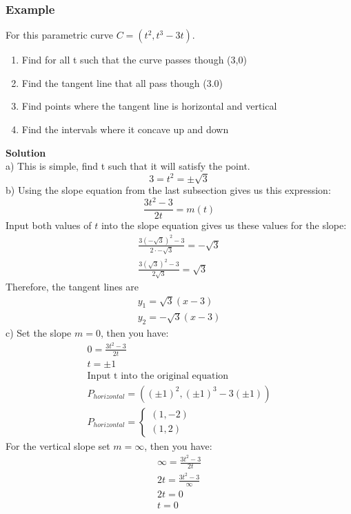 \documentclass[./MATH-115-Notes.tex]{subfiles}
\begin{document}
\subsubsection{Example}
For this parametric curve $ C = (t^2, t^3 - 3t) $.
\begin{enumerate}[label=\alph*)]
    \item Find for all t such that the curve passes though (3,0)
    \item Find the tangent line that all pass though (3.0)
    \item Find points where the tangent line is horizontal and vertical
    \item Find the intervals where it concave up and down
\end{enumerate}
\textbf{Solution}\\
\noindent
a) This is simple, find t such that it will satisfy the point.
$$
    3 = t^2 = \pm \sqrt{3}
$$
b) Using the slope equation from the last subsection gives us this expression:
$$
    \frac{3t^2-3}{2t} = m(t)
$$
Input both values of $t$ into the slope equation gives us these values for the slope:
\begin{gather*}
    \frac{3(-\sqrt{3})^2-3}{2\cdot-\sqrt{3}} = -\sqrt{3}\\
    \frac{3(\sqrt{3})^2-3}{2\sqrt{3}} = \sqrt{3}
\end{gather*}
Therefore, the tangent lines are 
\begin{gather*}
    y_1 = \sqrt{3}(x - 3)\\
    y_2 = -\sqrt{3}(x - 3)
\end{gather*}
c) Set the slope $m = 0$, then you have:
\begin{gather*}
    0 = \frac{3t^2-3}{2t}\\
    t = \pm 1 \\
    \text{Input t into the original equation}\\
    P_{horizontal} = ( (\pm 1)^2 , (\pm 1)^3 - 3(\pm 1) )\\
    P_{horizontal} = 
    \begin{cases}
    (1, -2)\\
    (1, 2)    
    \end{cases}
\end{gather*}
For the vertical slope set $m = \infty$, then you have:
\begin{gather*}
    \infty =  \frac{3t^2-3}{2t}\\
    2t = \frac{3t^2-3}{\infty}\\
    2t = 0\\
    t = 0
\end{gather*} 
\end{document}
